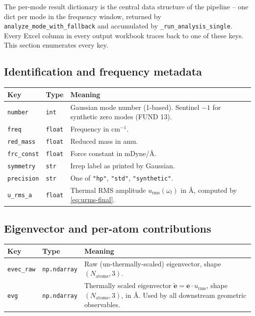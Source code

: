 \documentclass[10pt,a4paper,twoside]{article}
\newcommand{\evec}{\mathbf{e}}
\newcommand{\urms}{u_{\mathrm{rms}}}
\newcommand{\fn}[1]{\texttt{#1}}
\begin{document}
The per-mode result dictionary is the central data structure of the
pipeline -- one dict per mode in the frequency window, returned by
\fn{analyze\_mode\_with\_fallback} and accumulated by
\fn{\_run\_analysis\_single}. Every Excel column in every output
workbook traces back to one of these keys. This section enumerates
every key.

\subsection{Identification and frequency metadata}

\begin{longtable}{p{} p{} p{}}
\toprule
\textbf{Key} & \textbf{Type} & \textbf{Meaning} \\
\midrule
\texttt{number} & \texttt{int}
  & Gaussian mode number (1-based). Sentinel $-1$ for synthetic
    zero modes (FUND 13). \\
\texttt{freq} & \texttt{float}
  & Frequency in cm$^{-1}$. \\
\texttt{red\_mass} & \texttt{float}
  & Reduced mass in amu. \\
\texttt{frc\_const} & \texttt{float}
  & Force constant in mDyne/\AA{}. \\
\texttt{symmetry} & \texttt{str}
  & Irrep label as printed by Gaussian. \\
\texttt{precision} & \texttt{str}
  & One of \texttt{"hp"}, \texttt{"std"}, \texttt{"synthetic"}. \\
\texttt{u\_rms\_a} & \texttt{float}
  & Thermal RMS amplitude $\urms(\omega_l)$ in \AA{}, computed by
    \cref{eq:urms-final}. \\
\bottomrule
\end{longtable}

\subsection{Eigenvector and per-atom contributions}

\begin{longtable}{p{} p{} p{}}
\toprule
\textbf{Key} & \textbf{Type} & \textbf{Meaning} \\
\midrule
\texttt{evec\_raw} & \texttt{np.ndarray}
  & Raw (un-thermally-scaled) eigenvector, shape $(N_\text{atoms},
    3)$. \\
\texttt{evg} & \texttt{np.ndarray}
  & Thermally scaled eigenvector $\widetilde{\evec} = \evec \cdot
    \urms$, shape $(N_\text{atoms}, 3)$, in \AA{}. Used by all
    downstream geometric observables. \\
\bottomrule
\end{longtable}
\end{document}
